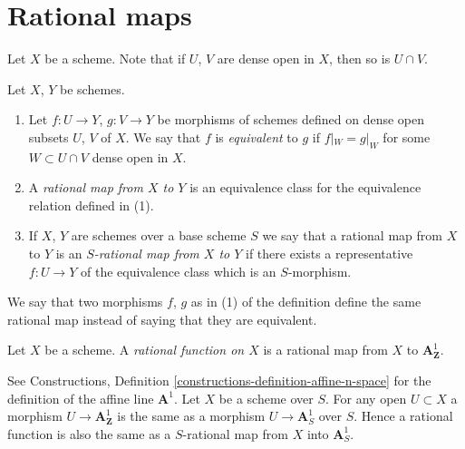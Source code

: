 \section{Rational maps}
\label{section-rational-maps}

\noindent
Let $X$ be a scheme. Note that if $U$, $V$ are dense open
in $X$, then so is $U \cap V$.

\begin{definition}
\label{definition-rational-map}
Let $X$, $Y$ be schemes.
\begin{enumerate}
\item Let $f : U \to Y$, $g : V \to Y$ be morphisms of schemes defined
on dense open subsets $U$, $V$ of $X$. We say that $f$ is
{\it equivalent} to $g$ if $f|_W = g|_W$ for some $W \subset U \cap V$
dense open in $X$.
\item A {\it rational map from $X$ to $Y$}
is an equivalence class for the equivalence relation defined in (1).
\item If $X$, $Y$ are schemes over a base scheme $S$ we say that
a rational map from $X$ to $Y$ is an {\it $S$-rational map from $X$
to $Y$} if there exists a representative $f : U \to Y$ of the equivalence
class which is an $S$-morphism.
\end{enumerate}
\end{definition}

\noindent
We say that two morphisms $f$, $g$ as in (1) of the definition
define the same rational map instead of saying that they are equivalent.

\begin{definition}
\label{definition-rational-function}
Let $X$ be a scheme. A {\it rational function on $X$} is a rational map
from $X$ to $\mathbf{A}^1_{\mathbf{Z}}$.
\end{definition}

\noindent
See Constructions, Definition \ref{constructions-definition-affine-n-space}
for the definition of the affine line $\mathbf{A}^1$. Let $X$ be a scheme
over $S$. For any open $U \subset X$ a morphism
$U \to \mathbf{A}^1_{\mathbf{Z}}$ is the same as a morphism
$U \to \mathbf{A}^1_S$ over $S$. Hence a rational function is
also the same as a $S$-rational map from $X$ into $\mathbf{A}^1_S$.

